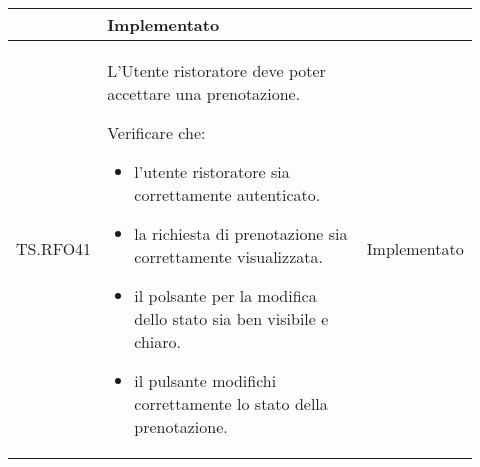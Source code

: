 \begin{longtable}{|p{0.10\linewidth}|p{0.70\linewidth}|p{0.12\linewidth}|}
\begin{itemize}
	\end{itemize}                                           &
	Implementato                                                                                                                                                   \\
	\hline
	TS.RFO41                                                                                                                        &
	L'Utente ristoratore deve poter accettare una prenotazione. \par
	Verificare che:
	\begin{itemize}
		\item l'utente ristoratore sia correttamente autenticato.
		\item la richiesta di prenotazione sia correttamente visualizzata.
		\item il polsante per la modifica dello stato sia ben visibile e chiaro.
		\item il pulsante modifichi correttamente lo stato della prenotazione.
	\end{itemize}                                                        &
	Implementato                                                                                                                                                   \\
	\hline


\end{longtable}
